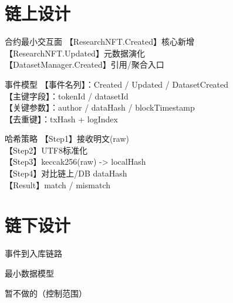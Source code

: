 \documentclass[10pt]{beamer}
\begin{document}
\section{链上设计}
\begin{frame}{合约最小交互面}
  【ResearchNFT.Created】核心新增\\
  【ResearchNFT.Updated】元数据演化\\
  【DatasetManager.Created】引用/聚合入口\\
\end{frame}
\begin{frame}{事件模型}
  【事件名列】：Created / Updated / DatasetCreated\\
  【主键字段】：tokenId / datasetId\\
  【关键参数】：author / dataHash / blockTimestamp\\
  【去重键】：txHash + logIndex\\
\end{frame}
\begin{frame}{哈希策略}
  【Step1】接收明文(raw)\\
  【Step2】UTF8标准化\\
  【Step3】keccak256(raw) -> localHash\\
  【Step4】对比链上/DB dataHash\\
  【Result】match / mismatch\\
\end{frame}

\section{链下设计}
\begin{frame}{事件到入库链路}
\end{frame}
\begin{frame}{最小数据模型}
\end{frame}
\begin{frame}{暂不做的（控制范围）}
\end{frame}
\end{document}
